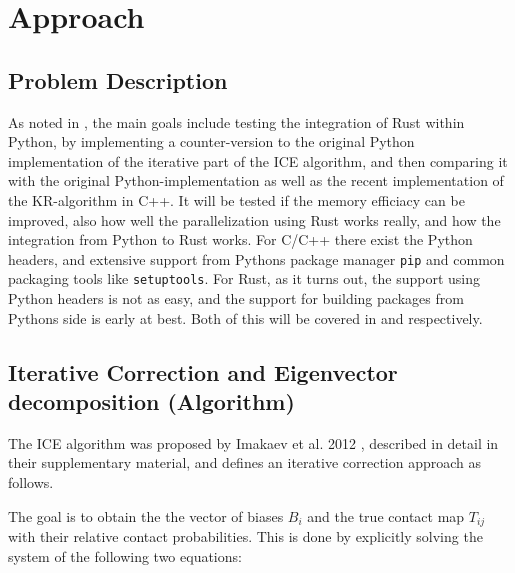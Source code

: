 \chapter{Approach}\label{chap:approach}



\section{Problem Description}\label{sec:problem}

As noted in , the main goals include testing the integration
of Rust within Python, by implementing a counter-version to the original Python
implementation of the iterative part of the ICE algorithm, and then comparing
it with the original Python-implementation as well as the recent implementation
of the KR-algorithm in C++. It will be tested if the memory efficiacy can be
improved, also how well the parallelization using Rust works really, and how
the integration from Python to Rust works. For C/C++ there exist the Python
headers, and extensive support from Pythons package manager \verb|pip| and
common packaging tools like \verb|setuptools|. For Rust, as it turns out, the
support using Python headers is not as easy, and the support for building packages
from Pythons side is early at best. Both of this will be covered in
 and  respectively.





\section{Iterative Correction and Eigenvector decomposition (Algorithm)}\label{sec:ICE}

The ICE algorithm was proposed by Imakaev et al. 2012
\cite{imakaev2012iterative}, described in detail in their supplementary
material, and defines an iterative correction approach as follows.

The goal is to obtain the the vector of biases $B_i$ and the true contact map
$T_{ij}$ with their relative contact probabilities. This is done by explicitly
solving the system of the following two equations:

